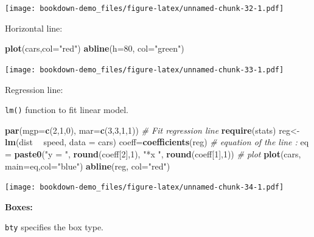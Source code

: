 \documentclass[]{book}
\newenvironment{Shaded}{\begin{snugshade}}{\end{snugshade}}
\newcommand{\KeywordTok}[1]{\textcolor[rgb]{0.13,0.29,0.53}{\textbf{#1}}}
\newcommand{\DataTypeTok}[1]{\textcolor[rgb]{0.13,0.29,0.53}{#1}}
\newcommand{\DecValTok}[1]{\textcolor[rgb]{0.00,0.00,0.81}{#1}}
\newcommand{\StringTok}[1]{\textcolor[rgb]{0.31,0.60,0.02}{#1}}
\newcommand{\CommentTok}[1]{\textcolor[rgb]{0.56,0.35,0.01}{\textit{#1}}}
\newcommand{\OperatorTok}[1]{\textcolor[rgb]{0.81,0.36,0.00}{\textbf{#1}}}
\newcommand{\NormalTok}[1]{#1}
\begin{document}
\texttt{[image: bookdown-demo\_files/figure-latex/unnamed-chunk-32-1.pdf]}

Horizontal line:

\begin{Shaded}
\begin{Highlighting}[]
\KeywordTok{plot}\NormalTok{(cars,}\DataTypeTok{col=}\StringTok{"red"}\NormalTok{)}
\KeywordTok{abline}\NormalTok{(}\DataTypeTok{h=}\DecValTok{80}\NormalTok{, }\DataTypeTok{col=}\StringTok{"green"}\NormalTok{)}
\end{Highlighting}
\end{Shaded}

\texttt{[image: bookdown-demo\_files/figure-latex/unnamed-chunk-33-1.pdf]}

Regression line:

\texttt{lm()} function to fit linear model.

\begin{Shaded}
\begin{Highlighting}[]
\KeywordTok{par}\NormalTok{(}\DataTypeTok{mgp=}\KeywordTok{c}\NormalTok{(}\DecValTok{2}\NormalTok{,}\DecValTok{1}\NormalTok{,}\DecValTok{0}\NormalTok{), }\DataTypeTok{mar=}\KeywordTok{c}\NormalTok{(}\DecValTok{3}\NormalTok{,}\DecValTok{3}\NormalTok{,}\DecValTok{1}\NormalTok{,}\DecValTok{1}\NormalTok{))}
\CommentTok{# Fit regression line}
\KeywordTok{require}\NormalTok{(stats)}
\NormalTok{reg<-}\KeywordTok{lm}\NormalTok{(dist }\OperatorTok{~}\StringTok{ }\NormalTok{speed, }\DataTypeTok{data =}\NormalTok{ cars)}
\NormalTok{coeff=}\KeywordTok{coefficients}\NormalTok{(reg)}
\CommentTok{# equation of the line : }
\NormalTok{eq =}\StringTok{ }\KeywordTok{paste0}\NormalTok{(}\StringTok{"y = "}\NormalTok{, }\KeywordTok{round}\NormalTok{(coeff[}\DecValTok{2}\NormalTok{],}\DecValTok{1}\NormalTok{), }\StringTok{"*x "}\NormalTok{, }\KeywordTok{round}\NormalTok{(coeff[}\DecValTok{1}\NormalTok{],}\DecValTok{1}\NormalTok{))}
\CommentTok{# plot}
\KeywordTok{plot}\NormalTok{(cars, }\DataTypeTok{main=}\NormalTok{eq,}\DataTypeTok{col=}\StringTok{"blue"}\NormalTok{)}
\KeywordTok{abline}\NormalTok{(reg, }\DataTypeTok{col=}\StringTok{"red"}\NormalTok{)}
\end{Highlighting}
\end{Shaded}

\texttt{[image: bookdown-demo\_files/figure-latex/unnamed-chunk-34-1.pdf]}

\textbf{Boxes: }

\texttt{bty} specifies the box type.
\end{document}
